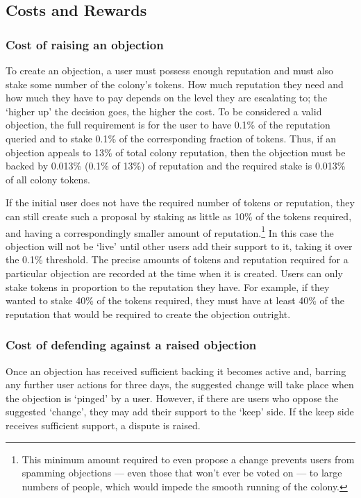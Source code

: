 \subsection{Costs and Rewards}\label{sec:costs-of-disputes}
\subsubsection{Cost of raising an objection}
To create an objection, a user must possess enough reputation and must also stake some number of the colony's tokens. How much reputation they need and how much they have to pay depends on the level they are escalating to; the `higher up' the decision goes, the higher the cost. To be considered a valid objection, the full requirement is for the user to have 0.1\% of the reputation queried and to stake 0.1\% of the corresponding fraction of tokens. Thus, if an objection appeals to 13\% of total colony reputation, then the objection must be backed by 0.013\% (0.1\% of 13\%) of reputation and the required stake is 0.013\% of all colony tokens.

If the initial user does not have the required number of tokens or reputation, they can still create such a proposal by staking as little as 10\% of the tokens required, and having a correspondingly smaller amount of reputation.\footnote{This minimum amount required to even propose a change prevents users from spamming objections --- even those that won’t ever be voted on --- to large numbers of people, which would impede the smooth running of the colony.} In this case the objection will not be `live' until other users add their support to it, taking it over the 0.1\% threshold. The precise amounts of tokens and reputation required for a particular objection are recorded at the time when it is created. Users can only stake tokens in proportion to the reputation they have. For example, if they wanted to stake 40\% of the tokens required, they must have at least 40\% of the reputation that would be required to create the objection outright.

\subsubsection{Cost of defending against a raised objection}
Once an objection has received sufficient backing it becomes active and, barring any further user actions for three days, the suggested change will take place when the objection is `pinged' by a user. However, if there are users who oppose the suggested `change', they may add their support to the `keep' side. If the keep side receives sufficient support, a dispute is raised. 

